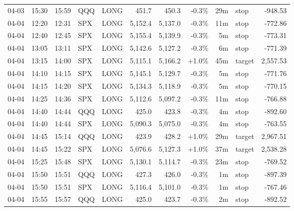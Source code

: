 \documentclass[11pt,a4paper,twoside]{article}
\begin{document}
\begin{center}
\begin{longtable}{>{\color{txtmain}}l l l l l r r r r >{\color{txtmain}}l r}
04-03 & 15:30 & 15:59 & QQQ & LONG & 451.7 & 450.3 & \textcolor{lossred}{-0.3\%} & 29m & stop & \textcolor{lossred}{-948.53} \\
04-04 & 12:20 & 12:31 & SPX & LONG & 5,152.4 & 5,137.0 & \textcolor{lossred}{-0.3\%} & 11m & stop & \textcolor{lossred}{-772.86} \\
04-04 & 12:40 & 12:45 & SPX & LONG & 5,155.4 & 5,139.9 & \textcolor{lossred}{-0.3\%} & 5m & stop & \textcolor{lossred}{-773.31} \\
04-04 & 13:05 & 13:11 & SPX & LONG & 5,142.6 & 5,127.2 & \textcolor{lossred}{-0.3\%} & 6m & stop & \textcolor{lossred}{-771.39} \\
04-04 & 13:15 & 14:00 & SPX & LONG & 5,115.1 & 5,166.2 & \textcolor{wingreen}{+1.0\%} & 45m & target & \textcolor{wingreen}{2,557.53} \\
04-04 & 14:10 & 14:15 & SPX & LONG & 5,145.1 & 5,129.7 & \textcolor{lossred}{-0.3\%} & 5m & stop & \textcolor{lossred}{-771.76} \\
04-04 & 14:15 & 14:20 & SPX & LONG & 5,134.3 & 5,118.9 & \textcolor{lossred}{-0.3\%} & 5m & stop & \textcolor{lossred}{-770.15} \\
04-04 & 14:25 & 14:36 & SPX & LONG & 5,112.6 & 5,097.2 & \textcolor{lossred}{-0.3\%} & 11m & stop & \textcolor{lossred}{-766.88} \\
04-04 & 14:40 & 14:44 & QQQ & LONG & 425.0 & 423.8 & \textcolor{lossred}{-0.3\%} & 4m & stop & \textcolor{lossred}{-892.60} \\
04-04 & 14:40 & 14:44 & SPX & LONG & 5,090.3 & 5,075.0 & \textcolor{lossred}{-0.3\%} & 4m & stop & \textcolor{lossred}{-763.55} \\
04-04 & 14:45 & 15:14 & QQQ & LONG & 423.9 & 428.2 & \textcolor{wingreen}{+1.0\%} & 29m & target & \textcolor{wingreen}{2,967.51} \\
04-04 & 14:45 & 15:22 & SPX & LONG & 5,076.6 & 5,127.3 & \textcolor{wingreen}{+1.0\%} & 37m & target & \textcolor{wingreen}{2,538.28} \\
04-04 & 15:25 & 15:48 & SPX & LONG & 5,130.1 & 5,114.7 & \textcolor{lossred}{-0.3\%} & 23m & stop & \textcolor{lossred}{-769.52} \\
04-04 & 15:50 & 15:51 & QQQ & LONG & 427.3 & 426.0 & \textcolor{lossred}{-0.3\%} & 1m & stop & \textcolor{lossred}{-897.39} \\
04-04 & 15:50 & 15:51 & SPX & LONG & 5,116.4 & 5,101.0 & \textcolor{lossred}{-0.3\%} & 1m & stop & \textcolor{lossred}{-767.46} \\
04-04 & 15:55 & 15:57 & QQQ & LONG & 425.0 & 423.7 & \textcolor{lossred}{-0.3\%} & 2m & stop & \textcolor{lossred}{-892.52} \\

\end{longtable}
\end{center}
\end{document}
